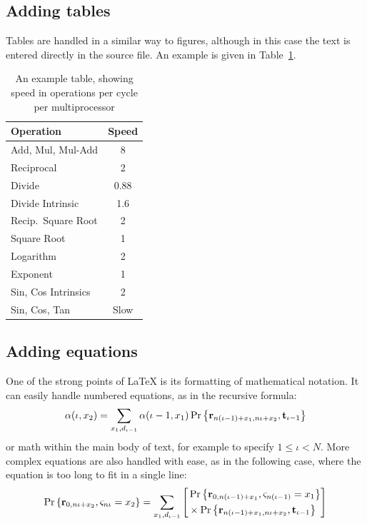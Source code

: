 \subsection{Adding tables}
Tables are handled in a similar way to figures, although in this case the text
is entered directly in the source file.
An example is given in Table~\ref{tab:sample}.

\begin{table}[tp]
   \begin{minipage}{\textwidth}
      \begin{center}
         \begin{tabular}{l|c}
            Operation            & Speed \\
            \hline
            Add, Mul, Mul-Add    & 8 \\
            Reciprocal           & 2 \\
            Divide               & 0.88 \\
            Divide Intrinsic     & 1.6 \\
            \hline
            Recip.\ Square Root  & 2 \\
            Square Root          & 1 \\
            \hline
            Logarithm            & 2 \\
            Exponent             & 1 \\
            \hline
            Sin, Cos Intrinsics  & 2 \\
            Sin, Cos, Tan        & Slow \\
         \end{tabular}
      \end{center}
   \end{minipage}
   \caption{An example table, showing speed in operations per cycle per
   multiprocessor}
   \label{tab:sample}
\end{table}
  
\subsection{Adding equations}
One of the strong points of \LaTeX{} is its formatting of mathematical notation.
It can easily handle numbered equations, as in the recursive formula:
\begin{equation}
\alpha(\iota,x_2) = \sum_{x_1,d_{\iota-1}} \alpha(\iota-1,x_1)
   \Pr\left\{ \mathbf{r}_{n(\iota-1)+x_1,n\iota+x_2}, \mathbf{t}_{\iota-1} \right\}
\end{equation}
or math within the main body of text, for example to specify $1 \leq \iota
< N$.
More complex equations are also handled with ease, as in the following case,
where the equation is too long to fit in a single line:
\begin{equation}
\Pr\left\{\mathbf{r}_{0,n\iota+x_2}, \varsigma_{n\iota}=x_2\right\}
= \sum_{x_1,d_{\iota-1}} \left[
\begin{split}
   & \Pr\left\{\mathbf{r}_{0,n(\iota-1)+x_1}, \varsigma_{n(\iota-1)}=x_1\right\} \\
   & \times \Pr\left\{ \mathbf{r}_{n(\iota-1)+x_1,n\iota+x_2}, \mathbf{t}_{\iota-1} \right\}
\end{split} \right]
\end{equation}

